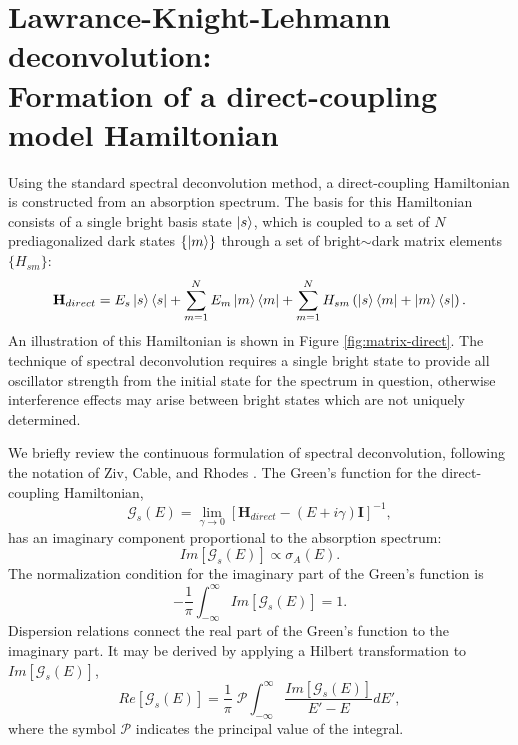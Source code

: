 \documentclass[12pt]{mitthesis}
\begin{document}
\section{Lawrance-Knight-Lehmann deconvolution: \\
  Formation of a direct-coupling model Hamiltonian}

Using the standard spectral deconvolution method, a direct-coupling
Hamiltonian is constructed from an absorption spectrum.  The basis for
this Hamiltonian consists of a single bright basis state $\mathinner{|{s}\rangle}$,
which is coupled to a set of $N$ prediagonalized dark states $\lbrace
\mathinner{|{m}\rangle} \rbrace$ through a set of bright$\sim$dark matrix elements
$\lbrace H_{sm} \rbrace$:
\begin{equation}
  \mathbf{H}_{direct} = 
  E_s\mathinner{|{s}\rangle}\mathinner{\langle{s}|} 
  + \sum_{m=1}^N E_m\mathinner{|{m}\rangle}\mathinner{\langle{m}|}
  + \sum_{m=1}^N H_{sm} \left (
    \mathinner{|{s}\rangle}\mathinner{\langle{m}|} + \mathinner{|{m}\rangle}\mathinner{\langle{s}|}
  \right ).
\end{equation}
An illustration of this Hamiltonian is shown in Figure
\ref{fig:matrix-direct}.  The technique of spectral deconvolution
requires a single bright state to provide all oscillator strength from
the initial state for the spectrum in question, otherwise interference
effects may arise between bright states which are not uniquely
determined.

We briefly review the continuous formulation of spectral
deconvolution, following the notation of Ziv, Cable, and Rhodes
\cite{ziv76, cable80}.  The Green's function for the direct-coupling
Hamiltonian,
\begin{equation}
  \label{eq:greens-function}
  \mathcal{G}_s(E) = 
  \underset{\gamma \rightarrow 0}{\lim}
  [\mathbf{H}_{direct} - (E + i \gamma)\mathbf{I}]^{-1},
\end{equation}
has an imaginary component proportional to the absorption spectrum:
\begin{equation}
  Im[\mathcal{G}_s(E)] \propto \sigma_A (E).
\end{equation}
The normalization condition for the imaginary part of the Green's
function is
\begin{equation}
  - \frac{1}{\pi} \int_{-\infty}^{\infty} Im[\mathcal{G}_s(E)] = 1.
\end{equation}
Dispersion relations connect the real part of the Green's function to
the imaginary part.  It may be derived by applying a Hilbert
transformation to $Im[\mathcal{G}_s(E)]$,
\begin{equation}
  \label{eq:hilbert}
  Re[\mathcal{G}_s(E)] = \frac{1}{\pi} \; 
  \mathcal{P} \int_{-\infty}^{\infty} 
  \frac{Im[\mathcal{G}_s(E)]}{E' - E} dE',
\end{equation}
where the symbol $\mathcal{P}$ indicates the principal value of the
integral.  
\end{document}

